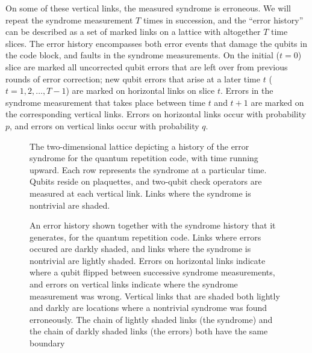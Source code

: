 On some of these vertical links, the measured syndrome is erroneous.  We will
repeat the syndrome measurement $T$ times in succession, and the ``error
history'' can be described as a set of marked links on a lattice with altogether $T$ time slices. The error
history encompasses both error events that damage the qubits in the code block,
and faults in the syndrome measurements. On the initial ($t=0$) slice are
marked all uncorrected qubit errors that are left over from previous rounds of
error correction; new qubit errors that arise at a later time $t$
($t=1,2,\dots,T-1$) are marked on horizontal links on slice $t$. Errors in the
syndrome measurement that takes place between time $t$ and $t+1$ are marked on the corresponding vertical links. Errors on horizontal links occur with probability $p$, and
errors on vertical links occur with probability $q$.

\begin{figure}
\begin{center}
\leavevmode
\epsfxsize=3in
\end{center}
\caption{The two-dimensional lattice depicting a history of the error syndrome for the quantum repetition code, with time running upward. Each row represents the syndrome at a particular time. Qubits reside on plaquettes, and two-qubit check operators are measured at each vertical link. Links where the syndrome is nontrivial are shaded.}
\label{fig:syndrome_history}
\end{figure}

\begin{figure}
\begin{center}
\leavevmode
\epsfxsize=3in
\end{center}
\caption{An error history shown together with the syndrome history that it generates, for the quantum repetition code. Links where errors occured are darkly shaded, and links where the syndrome is nontrivial are lightly shaded. Errors on horizontal links indicate where a qubit flipped between successive syndrome measurements, and errors on vertical links indicate where the syndrome measurement was wrong. Vertical links that are shaded both lightly and darkly are locations where a nontrivial syndrome was found erroneously. The chain of lightly shaded links (the syndrome) and the chain of darkly shaded links (the errors) both have the same boundary}
\label{fig:error_history}
\end{figure}

